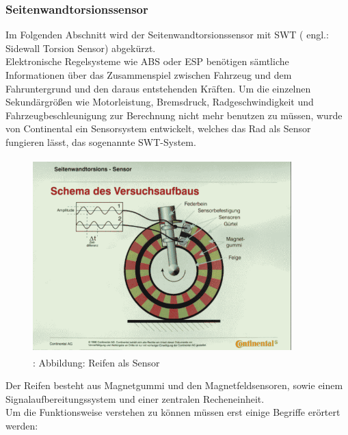 			\subsubsection{Seitenwandtorsionssensor}
				Im Folgenden Abschnitt wird der Seitenwandtorsionssensor mit SWT ( engl.: Sidewall Torsion Sensor) abgekürzt.\\ 
				Elektronische Regelsysteme wie ABS oder ESP benötigen sämtliche Informationen über das Zusammenspiel zwischen Fahrzeug und dem Fahruntergrund und den daraus entstehenden Kräften. Um die einzelnen Sekundärgrößen wie Motorleistung, Bremsdruck, Radgeschwindigkeit und Fahrzeugbeschleunigung zur Berechnung nicht mehr benutzen zu müssen, wurde von Continental ein Sensorsystem entwickelt, welches das Rad als Sensor fungieren lässt, das sogenannte SWT-System.
				
				\begin{figure}
					\centering
					\includegraphics[width=10cm, height=7.5cm] {swt1.png}
					\caption {\cite{TS17}: Abbildung: Reifen als Sensor}
				\end{figure}
			
				Der Reifen besteht aus Magnetgummi und den Magnetfeldsensoren, sowie einem Signalaufbereitungssystem und einer zentralen Recheneinheit.\\
				Um die Funktionsweise verstehen zu können müssen erst einige Begriffe erörtert werden:
				
